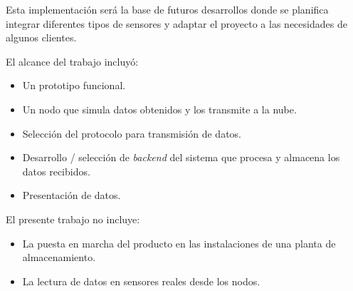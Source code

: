 Esta implementación será la base de futuros desarrollos donde se planifica integrar diferentes tipos de sensores y adaptar el proyecto a las necesidades de algunos clientes.  

El alcance del trabajo incluyó:
\begin{itemize}
\item Un prototipo funcional.
\item Un nodo que simula datos obtenidos y los transmite a la nube.
\item Selección del protocolo para transmisión de datos.
\item Desarrollo / selección de \textit{backend} del sistema que procesa y almacena los datos recibidos.
\item Presentación de datos.
\end{itemize}

El presente trabajo no incluye:
\begin{itemize}
    \item La puesta en marcha del producto en las instalaciones de una planta de almacenamiento.
    \item La lectura de datos en sensores reales desde los nodos.
\end{itemize}



